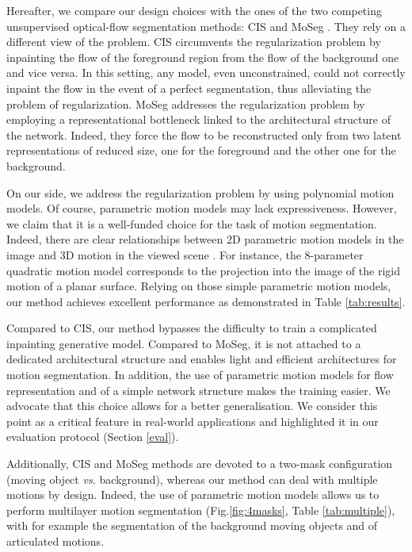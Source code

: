 \documentclass[10pt,twocolumn,letterpaper]{article}
\begin{document}
Hereafter, we compare our design choices with the ones of the two competing unsupervised optical-flow segmentation methods: CIS \cite{yang_unsupervised_2019} and MoSeg \cite{yang_motion-grouping_2021}. 
They rely on a different view of the problem. CIS circumvents the regularization problem by inpainting the flow of the foreground region from the flow of the background one and vice versa. In this setting, any model, even unconstrained, could not correctly inpaint the flow in the event of a perfect segmentation, thus alleviating the problem of regularization.
MoSeg addresses the regularization problem by employing a representational bottleneck linked to the architectural structure of the network. Indeed, they force the flow to be reconstructed only from two latent representations of reduced size, one for the foreground and the other one for the background.

On our side, we address the regularization problem by using polynomial motion models. Of course, parametric motion models may lack expressiveness. However, we claim that it is a well-funded choice for the task of motion segmentation. Indeed, there are clear relationships between 2D parametric motion models in the image and 3D motion in the viewed scene \cite{PB-EF1993}. For instance, the 8-parameter quadratic motion model corresponds to the projection into the image of the rigid motion of a planar surface. Relying on those simple parametric motion models, our method achieves excellent performance as demonstrated in Table \ref{tab:results}.

Compared to CIS, our method bypasses the difficulty to train a complicated inpainting generative model. Compared to MoSeg, it is not attached to a dedicated architectural structure and enables light and efficient architectures for motion segmentation. 
In addition, the use of parametric motion models for flow representation and of a simple network structure makes the training easier. We advocate that this choice allows for a better generalisation. We consider this point as a critical feature in real-world applications and highlighted it in our evaluation protocol (Section \ref{eval}). 





Additionally, CIS and MoSeg methods are devoted to a two-mask configuration (moving object \textit{vs.} background), whereas our method can deal with multiple motions by design. Indeed, the use of parametric motion models allows us to perform multilayer motion segmentation (Fig.\ref{fig:4masks}, {\color{black}Table \ref{tab:multiple}), with for example the segmentation of the background moving objects and of articulated motions.} 
\end{document}
